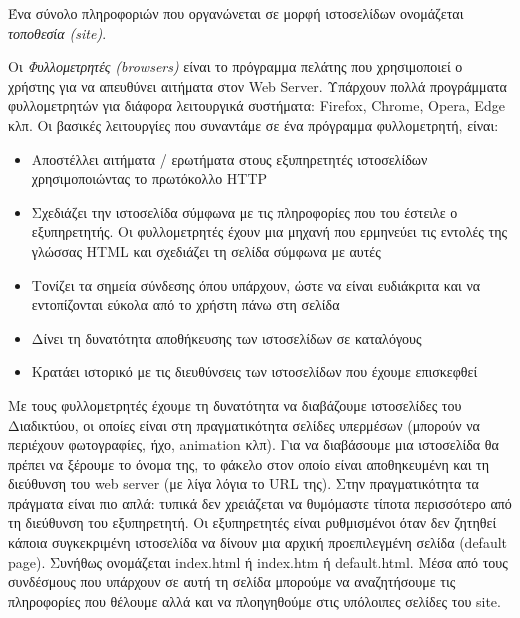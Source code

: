 Ένα σύνολο πληροφοριών που οργανώνεται σε μορφή ιστοσελίδων ονομάζεται \emph{τοποθεσία (site)}.

Οι \emph{Φυλλομετρητές (browsers)} είναι το πρόγραμμα πελάτης που χρησιμοποιεί ο χρήστης για να απευθύνει αιτήματα στον Web Server. Υπάρχουν πολλά προγράμματα φυλλομετρητών για διάφορα λειτουργικά συστήματα: Firefox, Chrome, Opera, Edge κλπ. Οι βασικές λειτουργίες που συναντάμε σε ένα πρόγραμμα φυλλομετρητή, είναι:

\begin{itemize}
\item Αποστέλλει αιτήματα / ερωτήματα στους εξυπηρετητές ιστοσελίδων χρησιμοποιώντας το πρωτόκολλο HTTP
\item Σχεδιάζει την ιστοσελίδα σύμφωνα με τις πληροφορίες που του έστειλε ο εξυπηρετητής. Οι φυλλομετρητές έχουν μια μηχανή που ερμηνεύει τις εντολές της γλώσσας HTML και σχεδιάζει τη σελίδα σύμφωνα με αυτές
\item Τονίζει τα σημεία σύνδεσης όπου υπάρχουν, ώστε να είναι ευδιάκριτα και να εντοπίζονται εύκολα από το χρήστη πάνω στη σελίδα
\item Δίνει τη δυνατότητα αποθήκευσης των ιστοσελίδων σε καταλόγους
\item Κρατάει ιστορικό με τις διευθύνσεις των ιστοσελίδων που έχουμε επισκεφθεί
\end{itemize}

Με τους φυλλομετρητές έχουμε τη δυνατότητα να διαβάζουμε ιστοσελίδες του Διαδικτύου, οι οποίες είναι στη πραγματικότητα σελίδες υπερμέσων (μπορούν να περιέχουν φωτογραφίες, ήχο, animation κλπ). Για να διαβάσουμε μια ιστοσελίδα θα πρέπει να ξέρουμε το όνομα της, το φάκελο στον οποίο είναι αποθηκευμένη και τη διεύθυνση του web server (με λίγα λόγια το URL της). Στην πραγματικότητα τα πράγματα είναι πιο απλά: τυπικά δεν χρειάζεται να θυμόμαστε τίποτα περισσότερο από τη διεύθυνση του εξυπηρετητή. Οι εξυπηρετητές είναι ρυθμισμένοι όταν δεν ζητηθεί κάποια συγκεκριμένη ιστοσελίδα να δίνουν μια αρχική προεπιλεγμένη σελίδα (default page). Συνήθως ονομάζεται index.html ή index.htm ή default.html. Μέσα από τους συνδέσμους που υπάρχουν σε αυτή τη σελίδα μπορούμε να αναζητήσουμε τις πληροφορίες που θέλουμε αλλά και να πλοηγηθούμε στις υπόλοιπες σελίδες του site.
